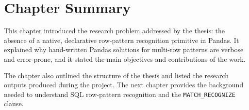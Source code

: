\section{Chapter Summary}
\label{sec:intro-summary}

This chapter introduced the research problem addressed by the
thesis: the absence of a native, declarative row-pattern recognition
primitive in Pandas.  It explained why hand-written Pandas solutions
for multi-row patterns are verbose and error-prone, and it stated
the main objectives and contributions of the work.

The chapter also outlined the structure of the thesis and listed the
research outputs produced during the project.  The next chapter
provides the background needed to understand SQL row-pattern
recognition and the \texttt{MATCH\_RECOGNIZE} clause.
